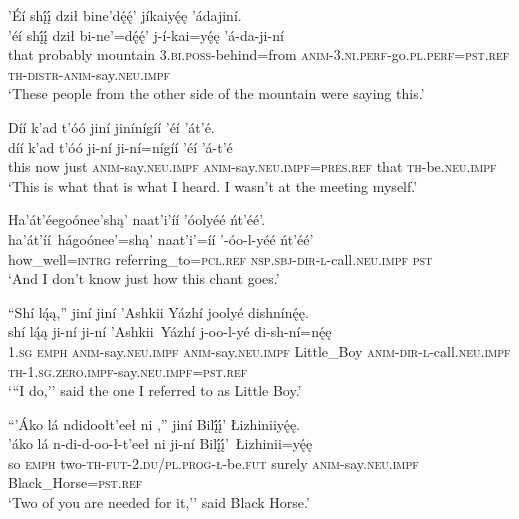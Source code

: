 \ea\label{ex:text1-23-9}
’Éí shį́į́ dził bine’dę́ę́’ jíkaiyę́ę ’ádajiní.\\
\gll ’éí	shį́į́	dził	bi-ne’=dę́ę́’	j-í-kai=yę́ę	’á-da-ji-ní\\
     that	probably	mountain	3.\textsc{bi}.\textsc{poss}-behind=from	\textsc{anim}-3.\textsc{ni}.\textsc{perf}-go.\textsc{pl}.\textsc{perf}=\textsc{pst}.\textsc{ref}	\textsc{th}-\textsc{distr}-\textsc{anim}-say.\textsc{neu}.\textsc{impf}\\
\glt `These people from the other side of the mountain were saying this.'
\z

\ea\label{ex:text1-23-10}
Díí k’ad t’óó jiní jinínígíí ’éí ’át’é.\\
\gll díí	k’ad	t’óó	ji-ní	ji-ní=nígíí	’éí	’á-t’é\\
     this	now	just	\textsc{anim}-say.\textsc{neu}.\textsc{impf}	\textsc{anim}-say.\textsc{neu}.\textsc{impf}=\textsc{pres}.\textsc{ref}	that	\textsc{th}-be.\textsc{neu}.\textsc{impf}\\
\glt `This is what that is what I heard. I wasn't at the meeting myself.'
\z

\ea\label{ex:text1-23-11}
Ha’át’éegoónee’shą’ naat’i’íí ’óolyéé ńt’éé’.\\
\gll ha’át’íí~{hágoónee’}=shą’	naat’i’=íí	’-óo-l-yéé	ńt’éé’\\
     how\_well=\textsc{intrg}	referring\_to=\textsc{pcl}.\textsc{ref}	\textsc{nsp}.\textsc{sbj}-\textsc{dir}-\textsc{l}-call.\textsc{neu}.\textsc{impf}	\textsc{pst}\\
\glt `And I don't know just how this chant goes.'
\z

\ea\label{ex:text1-24}
``Shí lą́ą,'' jiní jiní ’Ashkii Yázhí joolyé dishnínę́ę.\\
\gll shí	lą́ą	ji-ní	ji-ní	’Ashkii~{Yázhí}	j-oo-l-yé	di-sh-ní=nę́ę\\
     1.\textsc{sg}	\textsc{emph}	\textsc{anim}-say.\textsc{neu}.\textsc{impf}	\textsc{anim}-say.\textsc{neu}.\textsc{impf}	Little\_Boy	\textsc{anim}-\textsc{dir}-\textsc{l}-call.\textsc{neu}.\textsc{impf}	\textsc{th}-1.\textsc{sg}.\textsc{zero}.\textsc{impf}-say.\textsc{neu}.\textsc{impf}=\textsc{pst}.\textsc{ref}\\
\glt `{``}I do,'' said the one I referred to as Little Boy.'
\z

\ea\label{ex:text1-25}
``’Áko lá ndidoołt’eeł ni ,'' jiní Bilį́į́’ Łizhiniiyę́ę.\\
\gll ’áko	lá	n-di-d-oo-ł-t’eeł	ni	ji-ní	Bilį́į́’~{Łizhinii=yę́ę}\\
     so	\textsc{emph}	two-\textsc{th}-\textsc{fut}-2.\textsc{du}/\textsc{pl}.\textsc{prog}-\textsc{ł}-be.\textsc{fut}	surely	\textsc{anim}-say.\textsc{neu}.\textsc{impf}	Black\_Horse=\textsc{pst}.\textsc{ref}\\
\glt `Two of you are needed for it,'' said Black Horse.'
\z

